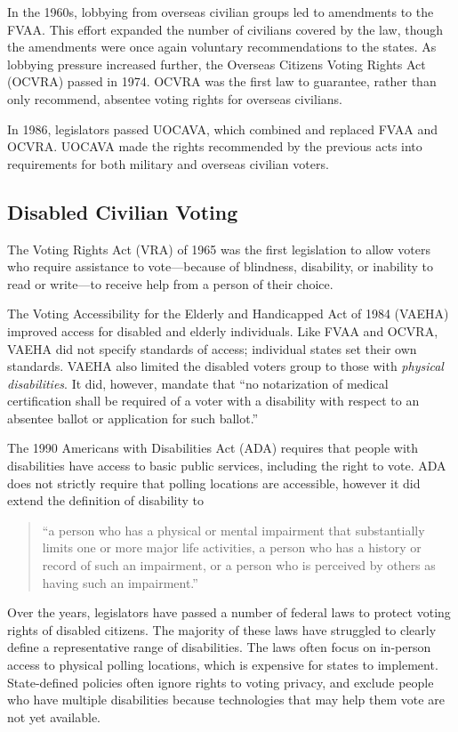 In the 1960s, lobbying from overseas civilian groups led to amendments
to the FVAA. This effort expanded the number of civilians covered by
the law, though the amendments were once again voluntary
recommendations to the states. As lobbying pressure increased further,
the Overseas Citizens Voting Rights Act (OCVRA) passed in 1974.  OCVRA
was the first law to guarantee, rather than only recommend, absentee
voting rights for overseas civilians.

In 1986, legislators passed UOCAVA, which combined and replaced FVAA
and OCVRA. UOCAVA made the rights recommended by the previous acts
into requirements for both military and overseas civilian voters.

\subsection{Disabled Civilian Voting}
The Voting Rights Act (VRA) of 1965 was the first legislation to allow
voters who require assistance to vote---because of blindness,
disability, or inability to read or write---to receive help from a
person of their choice.

The Voting Accessibility for the Elderly and Handicapped Act of 1984
(VAEHA) improved access for disabled and elderly individuals.  Like
FVAA and OCVRA, VAEHA did not specify standards of access; individual
states set their own standards. VAEHA also limited the disabled voters
group to those with {\em physical disabilities}. It did, however,
mandate that ``no notarization of medical certification shall be
required of a voter with a disability with respect to an absentee
ballot or application for such ballot.''

The 1990 Americans with Disabilities Act (ADA) requires that people
with disabilities have access to basic public services, including the
right to vote. ADA does not strictly require that polling locations
are accessible, however it did extend the definition of disability to
\begin{quote}
  ``a person who has a physical or mental impairment that
  substantially limits one or more major life activities, a person who
  has a history or record of such an impairment, or a person who is
  perceived by others as having such an impairment.''
\end{quote}

Over the years, legislators have passed a number of federal laws to
protect voting rights of disabled citizens. The majority of these laws
have struggled to clearly define a representative range of
disabilities. The laws often focus on in-person access to physical
polling locations, which is expensive for states to
implement. State-defined policies often ignore rights to voting
privacy, and exclude people who have multiple disabilities because
technologies that may help them vote are not yet available.


